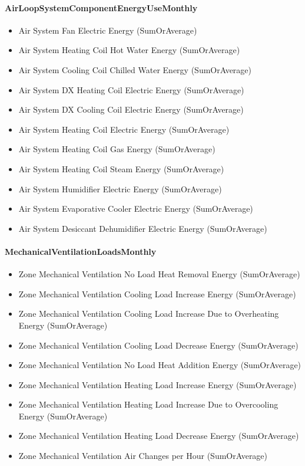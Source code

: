 \paragraph{AirLoopSystemComponentEnergyUseMonthly}\label{airloopsystemcomponentenergyusemonthly}

\begin{itemize}
\item
  Air System Fan Electric Energy (SumOrAverage)
\item
  Air System Heating Coil Hot Water Energy (SumOrAverage)
\item
  Air System Cooling Coil Chilled Water Energy (SumOrAverage)
\item
  Air System DX Heating Coil Electric Energy (SumOrAverage)
\item
  Air System DX Cooling Coil Electric Energy (SumOrAverage)
\item
  Air System Heating Coil Electric Energy (SumOrAverage)
\item
  Air System Heating Coil Gas Energy (SumOrAverage)
\item
  Air System Heating Coil Steam Energy (SumOrAverage)
\item
  Air System Humidifier Electric Energy (SumOrAverage)
\item
  Air System Evaporative Cooler Electric Energy (SumOrAverage)
\item
  Air System Desiccant Dehumidifier Electric Energy (SumOrAverage)
\end{itemize}

\paragraph{MechanicalVentilationLoadsMonthly}\label{mechanicalventilationloadsmonthly}

\begin{itemize}
\item
  Zone Mechanical Ventilation No Load Heat Removal Energy (SumOrAverage)
\item
  Zone Mechanical Ventilation Cooling Load Increase Energy (SumOrAverage)
\item
  Zone Mechanical Ventilation Cooling Load Increase Due to Overheating Energy (SumOrAverage)
\item
  Zone Mechanical Ventilation Cooling Load Decrease Energy (SumOrAverage)
\item
  Zone Mechanical Ventilation No Load Heat Addition Energy (SumOrAverage)
\item
  Zone Mechanical Ventilation Heating Load Increase Energy (SumOrAverage)
\item
  Zone Mechanical Ventilation Heating Load Increase Due to Overcooling Energy (SumOrAverage)
\item
  Zone Mechanical Ventilation Heating Load Decrease Energy (SumOrAverage)
\item
  Zone Mechanical Ventilation Air Changes per Hour (SumOrAverage)
\end{itemize}

